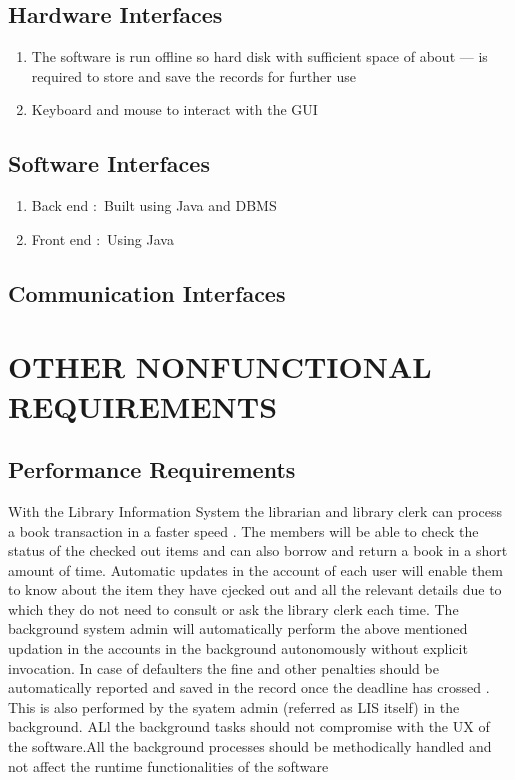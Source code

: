 \documentclass{article}
\begin{document}
\subsection{Hardware Interfaces}
\begin{enumerate}
\item The software is run offline so hard disk with sufficient space of about --- is required to store and save the records for further use
\item Keyboard and mouse to interact with the GUI
\end{enumerate}
\subsection{Software Interfaces}
\begin{enumerate}
\item Back end  $:$ Built using Java and DBMS
\item Front end $:$ Using Java 
\end{enumerate}

\subsection{Communication Interfaces}

\section{OTHER NONFUNCTIONAL REQUIREMENTS}
\subsection{Performance Requirements}
With the Library Information System the librarian and library clerk can process a book transaction in a faster speed .
The members will be able to check the status of the checked out items and can also borrow and return a book in a short amount of time.
Automatic updates in the account of each user will enable them to know about the item they have cjecked out and all the relevant details due to which they do not need to consult or ask the library clerk each time.
The background system admin will automatically perform the above mentioned updation in the accounts in the background autonomously without explicit invocation.
In case of defaulters the fine and other penalties should be automatically reported and saved in the record once the deadline has crossed . This is also performed by the syatem admin (referred as LIS itself) in the background.
ALl the background tasks should not compromise with the UX of the software.All the background processes should be methodically handled and not affect the runtime functionalities of the software
\end{document}
